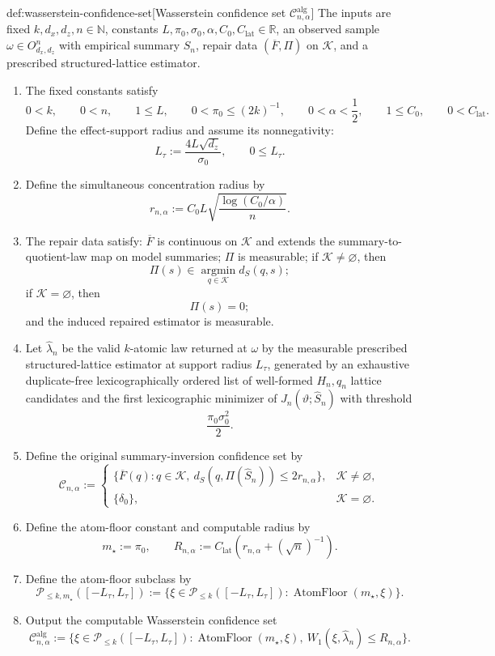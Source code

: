 \begin{algorithmv}{def:wasserstein-confidence-set}[Wasserstein confidence set \(\mathcal C^{\mathrm{alg}}_{n,\alpha}\)]
The inputs are fixed \(k,d_x,d_z,n\in\mathbb N\), constants \(L,\pi_0,\sigma_0,\alpha,C_0,C_{\mathrm{lat}}\in\mathbb R\), an observed sample \(\omega\in O_{d_x,d_z}^n\) with empirical summary \(\widehat S_n\), repair data \((\overline F,\Pi)\) on \(\mathcal K\), and a prescribed structured-lattice estimator.
\begin{enumerate}
\item The fixed constants satisfy
\[
0<k,\qquad 0<n,\qquad 1\le L,\qquad
0<\pi_0\le (2k)^{-1},\qquad
0<\alpha<\frac12,\qquad
1\le C_0,\qquad 0<C_{\mathrm{lat}}.
\]
Define the effect-support radius and assume its nonnegativity:
\[
L_\tau:=\frac{4L\sqrt{d_z}}{\sigma_0},\qquad 0\le L_\tau.
\]
\item Define the simultaneous concentration radius by
\[
r_{n,\alpha}:=C_0L\sqrt{\frac{\log(C_0/\alpha)}{n}}.
\]
\item The repair data satisfy: \(\overline F\) is continuous on \(\mathcal K\) and extends the summary-to-quotient-law map on model summaries; \(\Pi\) is measurable; if \(\mathcal K\ne\varnothing\), then
\[
\Pi(s)\in\operatorname*{argmin}_{q\in\mathcal K}d_S(q,s);
\]
if \(\mathcal K=\varnothing\), then
\[
\Pi(s)=0;
\]
and the induced repaired estimator is measurable.
\item Let \(\widehat\lambda_n\) be the valid \(k\)-atomic law returned at \(\omega\) by the measurable prescribed structured-lattice estimator at support radius \(L_\tau\), generated by an exhaustive duplicate-free lexicographically ordered list of well-formed \(H_n,q_n\) lattice candidates and the first lexicographic minimizer of \(J_n(\vartheta;\widehat S_n)\) with threshold
\[
\frac{\pi_0\sigma_0^2}{2}.
\]
\item Define the original summary-inversion confidence set by
\[
\mathcal C_{n,\alpha}:=
\begin{cases}
\{\overline F(q):q\in\mathcal K,\ d_S(q,\Pi(\widehat S_n))\le2r_{n,\alpha}\},&\mathcal K\ne\varnothing,\\
\{\delta_0\},&\mathcal K=\varnothing.
\end{cases}
\]
\item Define the atom-floor constant and computable radius by
\[
m_\star:=\pi_0,\qquad
R_{n,\alpha}:=C_{\mathrm{lat}}\left(r_{n,\alpha}+(\sqrt n)^{-1}\right).
\]
\item Define the atom-floor subclass by
\[
\mathcal P_{\le k,m_\star}([-L_\tau,L_\tau])
:=
\{\xi\in\mathcal P_{\le k}([-L_\tau,L_\tau]):
\operatorname{AtomFloor}(m_\star,\xi)\}.
\]
\item Output the computable Wasserstein confidence set
\[
\mathcal C^{\mathrm{alg}}_{n,\alpha}
:=
\{\xi\in\mathcal P_{\le k}([-L_\tau,L_\tau]):
\operatorname{AtomFloor}(m_\star,\xi),\
W_1(\xi,\widehat\lambda_n)\le R_{n,\alpha}\}.
\]
\end{enumerate}
\end{algorithmv}

